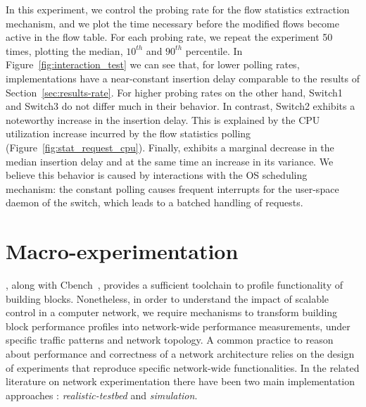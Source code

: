 In this experiment, we control the probing rate for the flow statistics
extraction mechanism, and we plot the time necessary before the modified flows
become active in the flow table. For each probing rate, we repeat the experiment
50 times, plotting the median, $10^{th}$ and $90^{th}$ percentile. In
Figure~\ref{fig:interaction_test} we can see that, for lower polling rates,
implementations have a near-constant insertion delay comparable to the results
of Section~\ref{sec:results-rate}.  For higher probing rates on the other hand,
Switch1 and Switch3 do not differ much in their behavior. In contrast, Switch2
exhibits a noteworthy increase in the insertion delay. This is explained by the
CPU utilization increase incurred by the flow statistics polling
(Figure~\ref{fig:stat_request_cpu}). Finally, \ovs exhibits a marginal decrease
in the median insertion delay and at the same time an increase in its variance.
We believe this behavior is caused by interactions with the OS scheduling
mechanism: the constant polling causes frequent interrupts for the user-space
daemon of the switch, which leads to a batched handling of requests.


\section{\of Macro-experimentation} \label{sec:sdnsim-intro}


\oflops, along with Cbench~\cite{cbench}, provides a sufficient toolchain to
profile functionality of \of building blocks.  Nonetheless, in order to
understand the impact of scalable control in a computer network, we require
mechanisms to transform \of building block performance profiles into
network-wide performance measurements, under specific traffic patterns and
network topology.  A common practice to reason about performance and correctness
of a network architecture relies on the design of experiments that reproduce
specific network-wide functionalities.  In the related literature on network
experimentation there have been two main implementation approaches : {\it
  realistic-testbed} and {\it simulation}.

